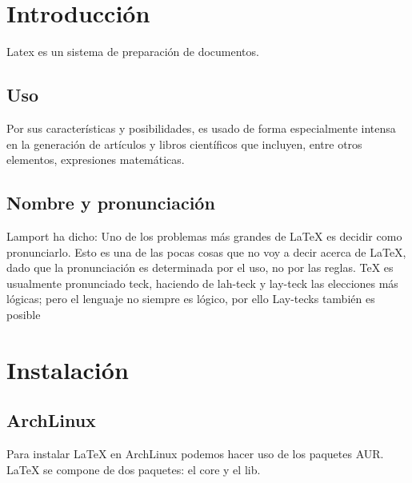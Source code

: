\section{Introducción}
    Latex es un sistema de preparación de documentos.
    \subsection{Uso}
    Por sus características y posibilidades, es usado de forma especialmente intensa en la generación de artículos y libros científicos que incluyen, entre otros elementos, expresiones matemáticas.
    \subsection{Nombre y pronunciación}
    Lamport ha dicho: Uno de los problemas más grandes de LaTeX es decidir como pronunciarlo. Esto es una de las pocas cosas que no voy a decir acerca de LaTeX, dado que la pronunciación es determinada por el uso, no por las reglas. TeX es usualmente pronunciado teck, haciendo de lah-teck y lay-teck las elecciones más lógicas; pero el lenguaje no siempre es lógico, por ello Lay-tecks también es posible
    \section{Instalación}
    \subsection{ArchLinux}
    Para instalar LaTeX en ArchLinux podemos hacer uso de los paquetes AUR.
    LaTeX se compone de dos paquetes: el core y el lib.
